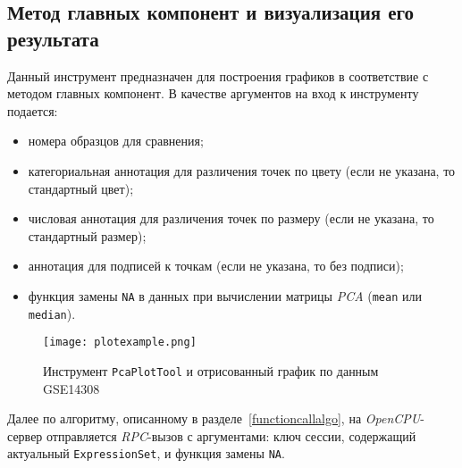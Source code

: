 \subsection{Метод главных компонент и визуализация его результата}
Данный инструмент предназначен для построения графиков в соответствие с методом главных компонент.
В качестве аргументов на вход к инструменту подается:
\begin{itemize}
\item номера образцов для сравнения;
\item категориальная аннотация для различения точек по цвету (если не указана, то стандартный цвет);
\item числовая аннотация для различения точек по размеру (если не указана, то стандартный размер);
\item аннотация для подписей к точкам (если не указана, то без подписи);
\item функция замены \texttt{NA} в данных при вычислении матрицы \emph{PCA} (\texttt{mean} или \texttt{median}).
\end{itemize}

\begin{figure}[h]
  \caption{Инструмент \texttt{PcaPlotTool} и отрисованный график по данным GSE14308}
  \texttt{[image: plotexample.png]}
  \label{plotexample}
\end{figure}

Далее по алгоритму, описанному в разделе~\ref{functioncallalgo}, на \emph{OpenCPU}-сервер отправляется \emph{RPC}-вызов с аргументами: ключ сессии, содержащий актуальный \texttt{ExpressionSet}, и функция замены \texttt{NA}.

